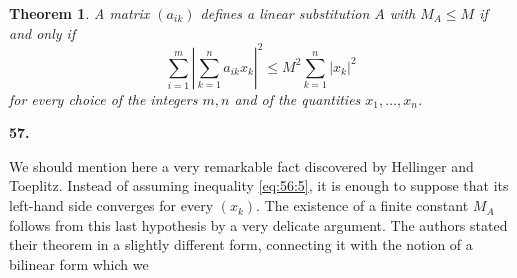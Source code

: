 \documentclass[
  paper=b5,
  fontsize=13pt,
  twoside=true,
  open=any,
  bookmarkpackage=false,
  chapterprefix=true,
  headings=normal
]{scrbook}
\newtheorem*{theorem}{Theorem}
\theoremstyle{definition}
\newcommand{\numberedparagraph}[1]{%
  \par\medskip\phantomsection\label{sec:#1}%
  \noindent\textbf{#1.}\enspace
}
\begin{document}
\begin{theorem}
A matrix $(a_{ik})$ defines a linear substitution $A$ with $M_A\leq M$ if
and only if
\[
  \sum_{i=1}^{m}\left|\sum_{k=1}^{n}a_{ik}x_k\right|^2
  \leq M^2\sum_{k=1}^{n}|x_k|^2
\]
for every choice of the integers $m,n$ and of the quantities
$x_1,\ldots,x_n$.
\end{theorem}

\numberedparagraph{57}
We should mention here a very remarkable fact discovered by Hellinger and
Toeplitz. Instead of assuming inequality \eqref{eq:56:5}, it is enough to
suppose that its left-hand side converges for every $(x_k)$. The existence
of a finite constant $M_A$ follows from this last hypothesis by a very
delicate argument. The authors stated their theorem in a slightly
different form, connecting it with the notion of a bilinear form which we
\end{document}
